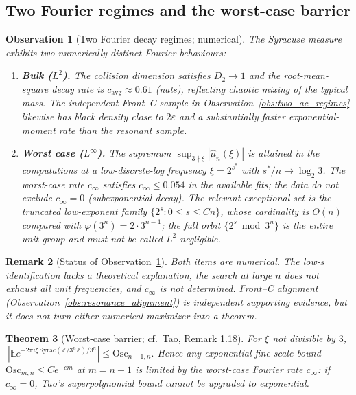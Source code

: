 \documentclass[12pt,a4paper]{article}
\newtheorem{theorem}{Theorem}[section]
\newtheorem{remark}[theorem]{Remark}
\newtheorem{observation}[theorem]{Observation}
\begin{document}
\subsection{Two Fourier regimes and the worst-case barrier}

\begin{observation}[Two Fourier decay regimes; numerical]
\label{obs:two_regimes}
The Syracuse measure exhibits two numerically distinct Fourier behaviours:
\begin{enumerate}
\item[(i)] \textbf{Bulk ($L^2$).} The collision dimension satisfies $D_2\to1$ and
the root-mean-square decay rate is $c_{\mathrm{avg}}\approx0.61$ (nats),
reflecting chaotic mixing of the typical mass.  The independent Front--C
sample in Observation~\ref{obs:two_ac_regimes} likewise has black density close
to $2\varepsilon$ and a substantially faster exponential-moment rate than the
resonant sample.
\item[(ii)] \textbf{Worst case ($L^\infty$).} The supremum
$\sup_{3\nmid\xi}|\hat\mu_n(\xi)|$ is attained in the computations at a
low-discrete-log frequency $\xi=2^{s^*}$ with $s^*/n\to\log_2 3$.  The
worst-case rate $c_\infty$ satisfies $c_\infty\le0.054$ in the available fits;
the data do not exclude $c_\infty=0$ (subexponential decay).  The relevant
exceptional set is the truncated low-exponent family
$\{2^s:0\le s\le Cn\}$, whose cardinality is $O(n)$ compared with
$\varphi(3^n)=2\cdot3^{n-1}$; the full orbit $\{2^s\bmod3^n\}$ is the entire
unit group and must not be called $L^2$-negligible.
\end{enumerate}
\end{observation}

\begin{remark}[Status of Observation~\ref{obs:two_regimes}]
Both items are numerical.  The low-$s$ identification lacks a theoretical
explanation, the search at large $n$ does not exhaust all unit frequencies,
and $c_\infty$ is not determined.  Front--C alignment
(Observation~\ref{obs:resonance_alignment}) is independent supporting evidence,
but it does not turn either numerical maximizer into a theorem.
\end{remark}

\begin{theorem}[Worst-case barrier; cf.\ Tao, Remark 1.18]
\label{thm:barrier}
For $\xi$ not divisible by $3$,
$\ |\mathbb E e^{-2\pi i\xi\,\mathrm{Syrac}(\mathbb Z/3^n\mathbb Z)/3^n}|
\le\mathrm{Osc}_{n-1,n}.$
Hence any exponential fine-scale bound $\mathrm{Osc}_{m,n}\le Ce^{-cm}$ at
$m=n-1$ is limited by the worst-case Fourier rate $c_\infty$: if $c_\infty=0$,
Tao's superpolynomial bound cannot be upgraded to exponential.
\end{theorem}
\end{document}

